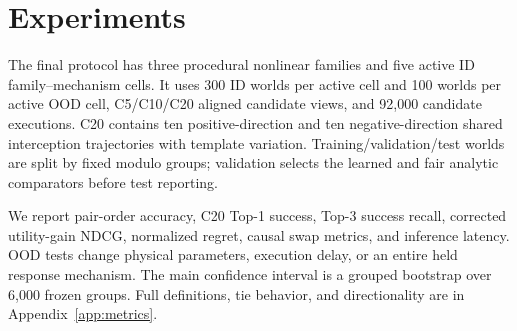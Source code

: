 \section{Experiments}
The final protocol has three procedural nonlinear families and five active ID family--mechanism cells. It uses 300 ID worlds per active cell and 100 worlds per active OOD cell, C5/C10/C20 aligned candidate views, and 92,000 candidate executions. C20 contains ten positive-direction and ten negative-direction shared interception trajectories with template variation. Training/validation/test worlds are split by fixed modulo groups; validation selects the learned and fair analytic comparators before test reporting.

We report pair-order accuracy, C20 Top-1 success, Top-3 success recall, corrected utility-gain NDCG, normalized regret, causal swap metrics, and inference latency. OOD tests change physical parameters, execution delay, or an entire held response mechanism. The main confidence interval is a grouped bootstrap over 6,000 frozen groups. Full definitions, tie behavior, and directionality are in Appendix~\ref{app:metrics}.
